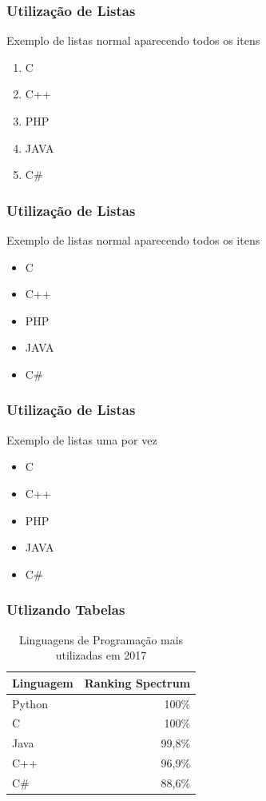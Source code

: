 \documentclass[compress]{beamer}
\begin{document}
\begin{frame}
    \frametitle{Utilização de Listas}
    Exemplo de listas normal aparecendo todos os itens
    \begin{enumerate}
       \vfill \item<+-> {C}
        \vfill \item<+-> {C++}
        \vfill \item<+-> {PHP}
        \vfill \item<+-> {JAVA}
        \vfill \item<+-> {C\#}
    \end{enumerate}
\end{frame}

\begin{frame}
    \frametitle{Utilização de Listas}
    Exemplo de listas normal aparecendo todos os itens
    \begin{itemize}
        \item {C}
        \item {C++}
        \item {PHP}
        \item {JAVA}
        \item {C\#}
    \end{itemize}
\end{frame}

\begin{frame}
    \frametitle{Utilização de Listas}
    Exemplo de listas uma por vez
    \begin{itemize}
        \vfill \item<+-> {C}
        \vfill \item<+-> {C++}
        \vfill \item<+-> {PHP}
        \vfill \item<+-> {JAVA}
        \vfill \item<+-> {C\#}
    \end{itemize}
\end{frame}

\begin{frame}
  \frametitle{Utlizando Tabelas}
  \begin{table}
    \caption{Linguagens de Programação mais utilizadas em 2017 \cite{ieeespectrum}}
    \begin{tabular}{lr}
      \toprule
      Linguagem & Ranking Spectrum\\
      \midrule
      Python & 100\% \\
      C & 100\% \\
      Java & 99,8\% \\
      C++ & 96,9\% \\
      C\# & 88,6\% \\
      \bottomrule
    \end{tabular}
  \end{table}
\end{frame}
\end{document}

